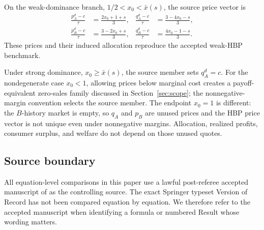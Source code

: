 On the weak-dominance branch, \(1/2<x_0<\bar x(s)\), the source price vector is
\begin{align}
\frac{p_A^d-c}{\tau}&=\frac{2x_0+1+s}{3},
&
\frac{q_A^d-c}{\tau}&=\frac{3-4x_0-s}{3},
\nonumber\\
\frac{p_B^d-c}{\tau}&=\frac{3-2x_0+s}{3},
&
\frac{q_B^d-c}{\tau}&=\frac{4x_0-1-s}{3}.
\label{eq:weak-hbp-prices}
\end{align}
These prices and their induced allocation reproduce the accepted weak-HBP benchmark.

Under strong dominance, \(x_0\ge\bar x(s)\), the source member sets \(q_A^d=c\). For the nondegenerate case \(x_0<1\), allowing prices below marginal cost creates a payoff-equivalent zero-sales family discussed in Section~\ref{sec:scope}; the nonnegative-margin convention selects the source member. The endpoint \(x_0=1\) is different: the \(B\)-history market is empty, so \(q_A\) and \(p_B\) are unused prices and the HBP price vector is not unique even under nonnegative margins. Allocation, realized profits, consumer surplus, and welfare do not depend on those unused quotes.

\subsection{Source boundary}

All equation-level comparisons in this paper use a lawful post-referee accepted manuscript of \citet{GehrigShyStenbacka2012} as the controlling source. The exact Springer typeset Version of Record has not been compared equation by equation. We therefore refer to the accepted manuscript when identifying a formula or numbered Result whose wording matters.
